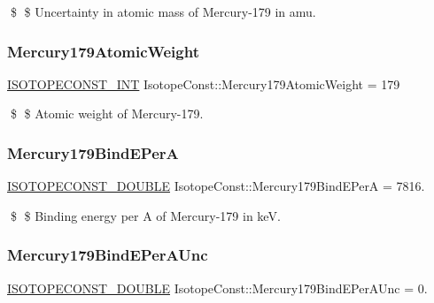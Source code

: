\$ \$ Uncertainty in atomic mass of Mercury-\/179 in amu. \mbox{\label{group___isotope_const-_mercury-_hg179_gab796b120fb6c0ec470139bef9c88fd35}} 
\subsubsection{\texorpdfstring{Mercury179\+Atomic\+Weight}{Mercury179AtomicWeight}}
{\footnotesize\ttfamily \mbox{\hyperlink{group___isotope_const-_macros_ga5f18360b3e99483a35c32d789e62621c}{I\+S\+O\+T\+O\+P\+E\+C\+O\+N\+S\+T\+\_\+\+I\+NT}} Isotope\+Const\+::\+Mercury179\+Atomic\+Weight = 179}

\$ \$ Atomic weight of Mercury-\/179. \mbox{\label{group___isotope_const-_mercury-_hg179_gafe36402445d635abc73515cff3af8789}} 
\subsubsection{\texorpdfstring{Mercury179\+Bind\+E\+PerA}{Mercury179BindEPerA}}
{\footnotesize\ttfamily \mbox{\hyperlink{group___isotope_const-_macros_ga8f45a7272ce02c0b4c65c44636ed719a}{I\+S\+O\+T\+O\+P\+E\+C\+O\+N\+S\+T\+\_\+\+D\+O\+U\+B\+LE}} Isotope\+Const\+::\+Mercury179\+Bind\+E\+PerA = 7816.}

\$ \$ Binding energy per A of Mercury-\/179 in keV. \mbox{\label{group___isotope_const-_mercury-_hg179_ga161bdc310fe2733802d6e5f12b2bcc2f}} 
\subsubsection{\texorpdfstring{Mercury179\+Bind\+E\+Per\+A\+Unc}{Mercury179BindEPerAUnc}}
{\footnotesize\ttfamily \mbox{\hyperlink{group___isotope_const-_macros_ga8f45a7272ce02c0b4c65c44636ed719a}{I\+S\+O\+T\+O\+P\+E\+C\+O\+N\+S\+T\+\_\+\+D\+O\+U\+B\+LE}} Isotope\+Const\+::\+Mercury179\+Bind\+E\+Per\+A\+Unc = 0.}


